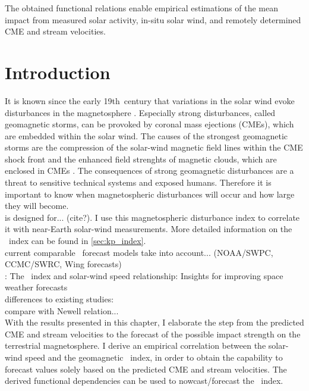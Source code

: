 The obtained functional relations enable empirical estimations of the mean \Kp{} impact from measured solar activity, in-situ solar wind, and remotely determined CME and stream velocities.



\section{Introduction}
It is known since the early 19th~century that variations in the solar wind evoke disturbances in the magnetosphere \citep{Bartels1962}. Especially strong disturbances, called geomagnetic storms, can be provoked by coronal mass ejections (CMEs), which are embedded within the solar wind. The causes of the strongest geomagnetic storms are the compression of the solar-wind magnetic field lines within the CME shock front and the enhanced field strenghts of magnetic clouds, which are enclosed in CMEs \citep{Bothmer1993,Bothmer1995}. The consequences of strong geomagnetic disturbances are a threat to sensitive technical systems and exposed humans. Therefore it is important to know when magnetospheric disturbances will occur and how large they will become.\\

\Kp{} is designed for... (cite?). I use this magnetospheric disturbance index to correlate it with near-Earth solar-wind measurements. More detailed information on the \Kp{}~index can be found in \autoref{sec:kp_index}.\\

current comparable \Kp~forecast models take into account... (NOAA/SWPC, CCMC/SWRC, Wing forecasts)\\
\citet{Elliott2013}: The \Kp~index and solar-wind speed relationship: Insights for improving space weather forecasts\\
differences to existing studies:\\
compare with Newell relation...\\

With the results presented in this chapter, I elaborate the step from the predicted CME and stream velocities to the forecast of the possible impact strength on the terrestrial magnetosphere. I derive an empirical correlation between the solar-wind speed and the geomagnetic \Kp~index, in order to obtain the capability to forecast \Kp{} values solely based on the predicted CME and stream velocities. The derived functional dependencies can be used to nowcast/forecast the \Kp~index.\\

